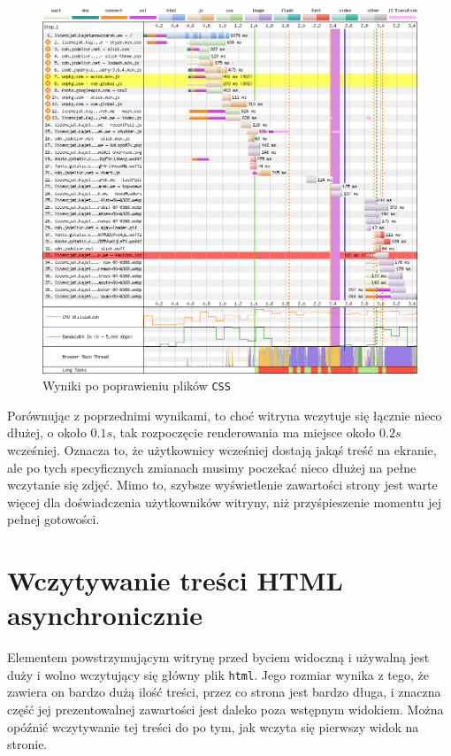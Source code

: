 \documentclass[licencjacka]{pracadypl}
\begin{document}
\begin{figure}[H]
  \centering
  \includegraphics[width=\linewidth]{images/waterfall-after-css.png}
  \caption{Wyniki po poprawieniu plików \texttt{CSS}}
  \label{fig:waterfall-after-css}
\end{figure}

Porównując z poprzednimi wynikami, to choć witryna wczytuje się łącznie nieco dłużej, o około $0.1s$, tak rozpoczęcie renderowania ma miejsce około $0.2s$ wcześniej. Oznacza to, że użytkownicy wcześniej dostają jakąś treść na ekranie, ale po tych specyficznych zmianach musimy poczekać nieco dłużej na pełne wczytanie się zdjęć. Mimo to, szybsze wyświetlenie zawartości strony jest warte więcej dla doświadczenia użytkowników witryny, niż przyśpieszenie momentu jej pełnej gotowości.

\section{Wczytywanie treści HTML asynchronicznie}

Elementem powstrzymującym witrynę przed byciem widoczną i używalną jest duży i wolno wczytujący się główny plik \texttt{html}. Jego rozmiar wynika z tego, że zawiera on bardzo dużą ilość treści, przez co strona jest bardzo długa, i znaczna część jej prezentowalnej zawartości jest daleko poza wstępnym widokiem. Można opóźnić wczytywanie tej treści do po tym, jak wczyta się pierwszy widok na stronie.
\end{document}
